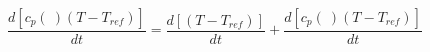 \begin{equation}
\frac{d [c_p(\ ) (T- T_{ref})]}{dt} = \frac{d [ (T- T_{ref})]}{dt} + \frac{d [c_p(\ ) (T- T_{ref})]}{dt}
\end{equation}